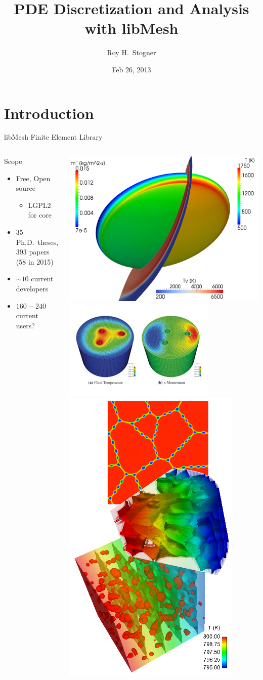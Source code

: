 \documentclass[mathserif]{beamer}
\date{Feb 26, 2013}
\author{Roy H.~Stogner\inst{1}}
\institute{\inst{1}The University of Texas at Austin}
\title[libMesh]{PDE Discretization and Analysis with libMesh}
\begin{document}
\begin{frame}
\titlepage
\end{frame}


\section{Introduction}


\begin{frame}{libMesh Finite Element Library}
\begin{columns}
\begin{block}{Scope}
\begin{itemize}
\item Free, Open source
\begin{itemize}
\item LGPL2 for core
\end{itemize}
\item 35 Ph.D.\ theses, 393 papers (58 in 2015)
\item $\sim10$ current developers
\item $160-240$ current users?
\end{itemize}
\end{block}

\includegraphics[width=.35\textwidth]{ablating_hs_wbg}
\includegraphics[width=.45\textwidth]{moose}
\includegraphics[width=.25\textwidth]{marmot1b}
\end{columns}


\end{frame}
\end{document}
